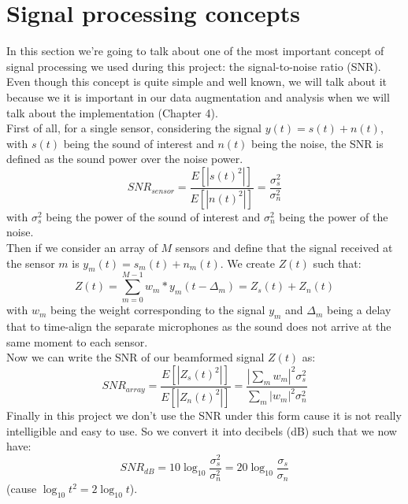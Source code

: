 \documentclass[11pt,a4paper,titlepage]{report}
\begin{document}
\section{Signal processing concepts}
\label{sec:Signal processing concepts}
\hspace*{0.6cm}
In this section we're going to talk about one of the most important concept of signal processing we used during this project: the signal-to-noise ratio (SNR). Even though this concept is quite simple and well known, we will talk about it because we it is important in our data augmentation and analysis when we will talk about the implementation (Chapter 4).\\
\hspace*{0.6cm}
First of all, for a single sensor, considering the signal $ y(t) = s(t) + n(t) $, with $ s(t) $ being the sound of interest and $ n(t) $ being the noise, the SNR is defined as the sound power over the noise power.
\begin{equation}
SNR_{sensor} = \dfrac{E[|s(t)^2|]}{E[|n(t)^2|]} = \dfrac{\sigma_{s}^2}{\sigma_{n}^2} 
\end{equation}
with $\sigma_{s}^2$ being the power of the sound of interest and $\sigma_{n}^2$ being the power of the noise.\\
Then if we consider an array of $ M $ sensors and define that the signal received at the sensor $ m $ is $ y_{m}(t) = s_{m}(t) + n_{m}(t) $. We create $ Z(t) $ such that:
\begin{equation}
Z(t) = \sum_{m=0}^{M-1}{w_{m}* y_{m}(t-\Delta_{m})} = Z_{s}(t) + Z_{n}(t) 
\end{equation}
with $ w_{m} $ being the weight corresponding to the signal $ y_{m} $ and $\Delta_{m}$ being a delay that to time-align the separate microphones as the sound does not arrive at the same moment to each sensor.\\
Now we can write the SNR of our beamformed signal $ Z(t) $ as:
\begin{equation}
SNR_{array} = \dfrac{E[|Z_{s}(t)^2|]}{E[|Z_{n}(t)^2|]} = \dfrac{|\sum_{m}w_{m}|^2 \sigma_{s}^2} {\sum_{m}|w_{m}|^2 \sigma_{n}^2} 
\end{equation}
\hspace*{0.6cm}
Finally in this project we don't use the SNR under this form cause it is not really intelligible and easy to use. So we convert it into decibels (dB) such that we now have:
\begin{equation}
SNR_{dB} = 10\log_{10}{\dfrac{\sigma_{s}^2}{\sigma_{n}^2}} = 20\log_{10}{\dfrac{\sigma_{s}}{\sigma_{n}}} 
\end{equation}
\hspace*{3.4cm}(cause $\log_{10}{t^2} = 2\log_{10}{t}$).
\end{document}
